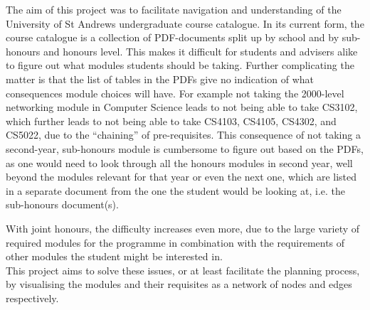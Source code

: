 The aim of this project was to facilitate navigation and understanding of the
University of St Andrews undergraduate course catalogue. In its current form,
the course catalogue is a collection of PDF-documents split up by school and by
sub-honours and honours level. This makes it difficult for students and advisers
alike to figure out what modules students should be taking. Further complicating
the matter is that the list of tables in the PDFs give no indication of what
consequences module choices will have. For example not taking the 2000-level
networking module in Computer Science leads to not being able to take CS3102,
which further leads to not being able to take CS4103, CS4105, CS4302, and
CS5022, due to the ``chaining'' of pre-requisites. This consequence of not
taking a second-year, sub-honours module is cumbersome to figure out based on
the PDFs, as one would need to look through all the honours modules in second
year, well beyond the modules relevant for that year or even the next one, which
are listed in a separate document from the one the student would be looking at,
i.e. the sub-honours document(s).

With joint honours, the difficulty increases even more, due to the large variety
of required modules for the programme in combination with the requirements of
other modules the student might be interested in.
\\

This project aims to solve these issues, or at least facilitate the planning
process, by visualising the modules and their requisites as a network of nodes
and edges respectively.
